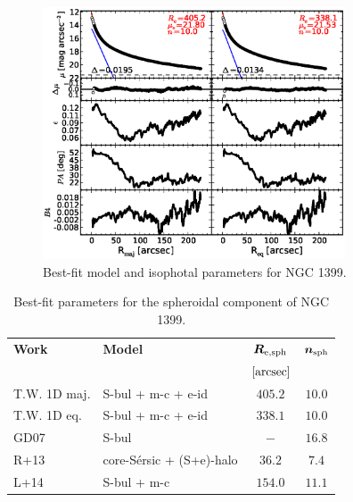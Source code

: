 \documentclass[preprint2]{emulateapj}
\newcommand{\fitfigurewidth}{0.8\textwidth}
\begin{document}
  \begin{figure}[h]
  \begin{center}
  \includegraphics[width=\fitfigurewidth]{images/n1399_1Dfit.eps}
  \caption{Best-fit model and isophotal parameters for NGC 1399.}
  \end{center}
  \end{figure}

  \begin{table}[h]
  \small
  \caption{Best-fit parameters for the spheroidal component of NGC 1399.}
  \begin{center}
  \begin{tabular}{llcc}
  \hline
  {\bf Work} & {\bf Model}   & $\bm R_{\rm e,sph}$    & $\bm n_{\rm sph}$ \\
    &  &  $[\rm arcsec]$ & \\
  \hline
  T.W. 1D maj. & S-bul + m-c + e-id & $405.2$  &  $10.0$ \\
  T.W. 1D eq.  & S-bul + m-c + e-id & $338.1$  &  $10.0$ \\
  \hline
  GD07         & S-bul  		    & $-$      &  $16.8$ \\
  R+13         & core-S\'ersic + (S+e)-halo & $36.2$   &  $7.4$ \\
  L+14         & S-bul + m-c		    & $154.0$  &  $11.1$ \\
  \hline
  \end{tabular}
  \end{center}
  \label{tab:n1399}
  \end{table}
\end{document}
